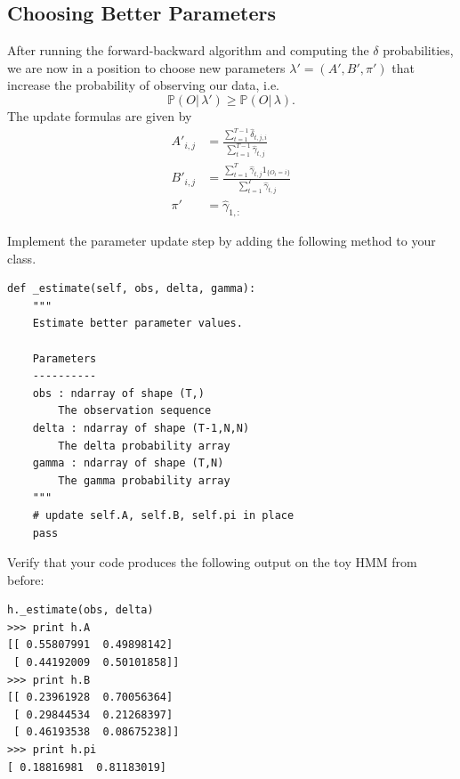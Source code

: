 \subsection*{Choosing Better Parameters}
After running the forward-backward algorithm and computing the $\delta$ probabilities, we are now in a position to choose new parameters $\lambda' = (A', B', \pi')$
that increase the probability of observing our data, i.e.
\[
\mathbb{P}(O|\,\lambda') \geq \mathbb{P}(O|\,\lambda).
\]
The update formulas are given by
\begin{align*}
A'_{i,j} &= \frac{\sum_{t=1}^{T-1}\widehat{\delta}_{t,j,i}}{\sum_{t=1}^{T-1}\widehat{\gamma}_{t,j}}\\
B'_{i,j} &= \frac{\sum_{t=1}^{T}\widehat{\gamma}_{t,j}1_{\{O_t=i\}}}{\sum_{t=1}^{T}\widehat{\gamma}_{t,j}}\\
\pi' &= \widehat{\gamma}_{1,:}
\end{align*}
\begin{problem}
Implement the parameter update step by adding the following method to your class.
\begin{lstlisting}
def _estimate(self, obs, delta, gamma):
    """
    Estimate better parameter values.

    Parameters
    ----------
    obs : ndarray of shape (T,)
        The observation sequence
    delta : ndarray of shape (T-1,N,N)
        The delta probability array
    gamma : ndarray of shape (T,N)
        The gamma probability array
    """
    # update self.A, self.B, self.pi in place
    pass
\end{lstlisting}
Verify that your code produces the following output on the toy HMM from before:
\begin{lstlisting}
h._estimate(obs, delta)
>>> print h.A
[[ 0.55807991  0.49898142]
 [ 0.44192009  0.50101858]]
>>> print h.B
[[ 0.23961928  0.70056364]
 [ 0.29844534  0.21268397]
 [ 0.46193538  0.08675238]]
>>> print h.pi
[ 0.18816981  0.81183019]
\end{lstlisting}
\end{problem}

